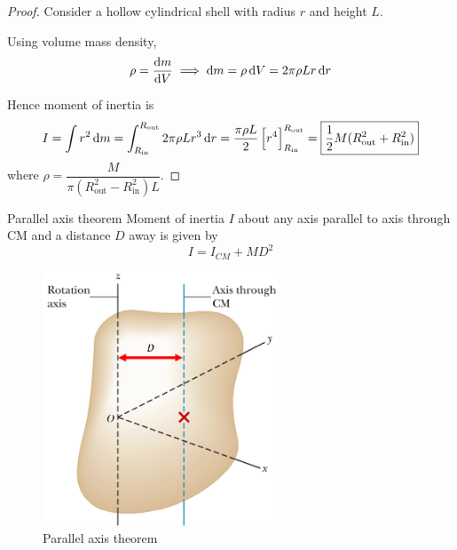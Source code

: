 \begin{proof}
Consider a hollow cylindrical shell with radius $r$ and height $L$.

Using volume mass density,
\[ \rho=\dv{m}{V} \implies \dd{m}=\rho\dd{V} = 2\pi\rho Lr \dd{r} \]

Hence moment of inertia is 
\[ I = \int r^2\dd{m} = \int_{R_\text{in}}^{R_\text{out}} 2\pi\rho Lr^3 \dd{r} = \frac{\pi\rho L}{2}\left[r^4\right]_{R_\text{in}}^{R_\text{out}} = \boxed{\frac{1}{2}M(R_\text{out}^2+R_\text{in}^2)} \]
where $\rho = \dfrac{M}{\pi(R_\text{out}^2-R_\text{in}^2)L}$.
\end{proof}
\pagebreak

\begin{thrm}{Parallel axis theorem}{}
Moment of inertia $I$ about any axis parallel to axis through CM and a distance $D$ away is given by
\begin{equation}
I = I_{CM} + MD^2
\end{equation}
\end{thrm}

\begin{figure}[H]
    \centering
    \includegraphics[width=7cm]{images/Parallel_axis_theorem.png}
    \caption{Parallel axis theorem}
\end{figure}

